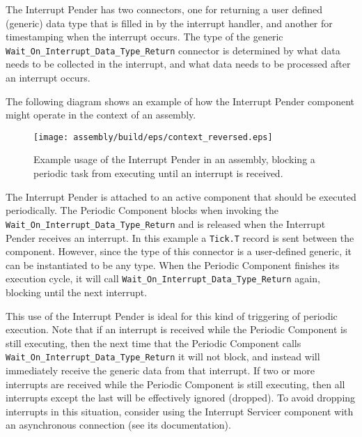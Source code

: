 The Interrupt Pender has two connectors, one for returning a user defined (generic) data type that is filled in by the interrupt handler, and another for timestamping when the interrupt occurs. The type of the generic \texttt{Wait\_On\_Interrupt\_Data\_Type\_Return} connector is determined by what data needs to be collected in the interrupt, and what data needs to be processed after an interrupt occurs. 

The following diagram shows an example of how the Interrupt Pender component might operate in the context of an assembly.

\begin{figure}[H]
  \texttt{[image: assembly/build/eps/context\_reversed.eps]}
  \caption{Example usage of the Interrupt Pender in an assembly, blocking a periodic task from executing until an interrupt is received.}
\end{figure}

The Interrupt Pender is attached to an active component that should be executed periodically. The Periodic Component blocks when invoking the \texttt{Wait\_On\_Interrupt\_Data\_Type\_Return} and is released when the Interrupt Pender receives an interrupt. In this example a \texttt{Tick.T} record is sent between the component. However, since the type of this connector is a user-defined generic, it can be instantiated to be any type. When the Periodic Component finishes its execution cycle, it will call \texttt{Wait\_On\_Interrupt\_Data\_Type\_Return} again, blocking until the next interrupt.

This use of the Interrupt Pender is ideal for this kind of triggering of periodic execution. Note that if an interrupt is received while the Periodic Component is still executing, then the next time that the Periodic Component calls \texttt{Wait\_On\_Interrupt\_Data\_Type\_Return} it will not block, and instead will immediately receive the generic data from that interrupt. If two or more interrupts are received while the Periodic Component is still executing, then all interrupts except the last will be effectively ignored (dropped). To avoid dropping interrupts in this situation, consider using the Interrupt Servicer component with an asynchronous connection (see its documentation).
